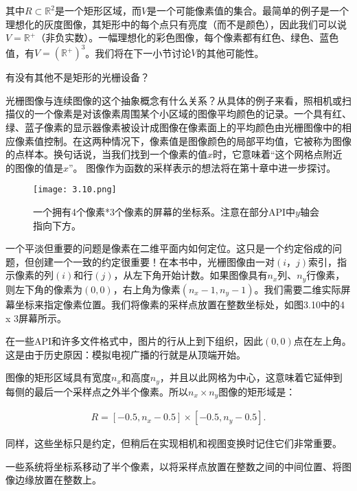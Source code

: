\documentclass[lang=cn,12pt]{elegantbook}
\begin{document}
其中$R\subset \mathbb{R} ^2$是一个矩形区域，而$V$是一个可能像素值的集合。最简单的例子是一个理想化的灰度图像，其矩形中的每个点只有亮度（而不是颜色），因此我们可以说$V=\mathbb{R}^{+}$（非负实数）。一幅理想化的彩色图像，每个像素都有红色、绿色、蓝色值，有$V=(\mathbb{R}^{+})^3$。我们将在下一小节讨论$V$的其他可能性。

\begin{note}
  有没有其他不是矩形的光栅设备？
\end{note}

光栅图像与连续图像的这个抽象概念有什么关系？从具体的例子来看，照相机或扫描仪的一个像素是对该像素周围某个小区域的图像平均颜色的记录。一个具有红、绿、蓝子像素的显示器像素被设计成图像在像素面上的平均颜色由光栅图像中的相应像素值控制。在这两种情况下，像素值是图像颜色的局部平均值，它被称为图像的点样本。换句话说，当我们找到一个像素的值$x$时，它意味着“这个网格点附近的图像的值是$x$”。 图像作为函数的采样表示的想法将在第十章中进一步探讨。

\begin{figure}[htb]
  \centering
  \texttt{[image: 3.10.png]}
  \caption{一个拥有4个像素*3个像素的屏幕的坐标系。注意在部分API中$y$轴会指向下方。}
\end{figure}

一个平淡但重要的问题是像素在二维平面内如何定位。这只是一个约定俗成的问题，但创建一个一致的约定很重要！在本书中，光栅图像由一对$(i，j)$索引，指示像素的列$(i)$和行$(j)$，从左下角开始计数。如果图像具有$n_x$列、$n_y$行像素，则左下角的像素为$(0,0)$，右上角为像素$(n_x-1,n_y-1)$。我们需要二维实际屏幕坐标来指定像素位置。我们将像素的采样点放置在整数坐标处，如图3.10中的4 x 3屏幕所示。

\begin{note}
  在一些API和许多文件格式中，图片的行从上到下组织，因此$(0,0)$点在左上角。这是由于历史原因：模拟电视广播的行就是从顶端开始。
\end{note}

图像的矩形区域具有宽度$n_x$和高度$n_y$，并且以此网格为中心，这意味着它延伸到每侧的最后一个采样点之外半个像素。所以$n_x \times n_y$图像的矩形域是：

\[
  \begin{aligned}
    R=[-0.5,n_x-0.5]\times [-0.5,n_y-0.5].
  \end{aligned}
\]

同样，这些坐标只是约定，但稍后在实现相机和视图变换时记住它们非常重要。

\begin{note}
  一些系统将坐标系移动了半个像素，以将采样点放置在整数之间的中间位置、将图像边缘放置在整数上。
\end{note}
\end{document}
